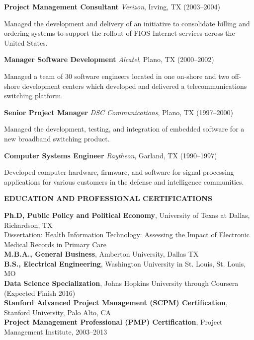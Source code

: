 \documentclass{article}
\newcommand{\sbt}{\,\begin{picture}(-1,1)(-1,-3)\circle*{3}\end{picture}\ }
\newenvironment{tightcenter}{%
  \setlength\topsep{0pt}
  \setlength\parskip{10pt}
  \begin{center}
}{%
  \end{center}
}
\begin{document}
\noindent
{\bfseries Project Management Consultant} {\itshape Verizon}, Irving, TX (2003--2004)
\begin{compactitem}
\item[\sbt] Managed the development and delivery of an initiative to consolidate billing and ordering systems to support the rollout of FIOS Internet services across the United States.
\end{compactitem}

\noindent
{\bfseries Manager Software Development} {\itshape Alcatel}, Plano, TX (2000--2002)
\begin{compactitem}
\item[\sbt] Managed a team of 30 software engineers located in one on-shore and two off-shore development centers which developed and delivered a telecommunications switching platform.
\end{compactitem}

\noindent
{\bfseries Senior Project Manager} {\itshape DSC Communications}, Plano, TX (1997--2000)
\begin{compactitem}
\item[\sbt] Managed the development, testing, and integration of embedded software for a new broadband switching product.
\end{compactitem}

\noindent
{\bfseries Computer Systems Engineer} {\itshape Raytheon}, Garland, TX (1990--1997)
\begin{compactitem}
\item[\sbt] Developed computer hardware, firmware, and software for signal processing applications for various customers in the defense and intelligence communities.
\end{compactitem}

\begin{tightcenter}
{\bfseries \large EDUCATION AND PROFESSIONAL CERTIFICATIONS}
\end{tightcenter}

\noindent
{\bfseries Ph.D, Public Policy and Political Economy}, University of Texas at Dallas, Richardson, TX \\
Dissertation: Health Information Technology: Assessing the Impact of Electronic Medical Records in Primary Care \\
{\bfseries M.B.A., General Business}, Amberton University, Dallas TX \\
{\bfseries B.S., Electrical Engineering}, Washington University in St. Louis, St. Louis, MO \\
{\bfseries Data Science Specialization}, Johns Hopkins University through Coursera (Expected Finish 2016) \\
{\bfseries Stanford Advanced Project Management (SCPM) Certification}, Stanford University, Palo Alto, CA \\
{\bfseries Project Management Professional (PMP) Certification}, Project Management Institute, 2003--2013
\end{document}
